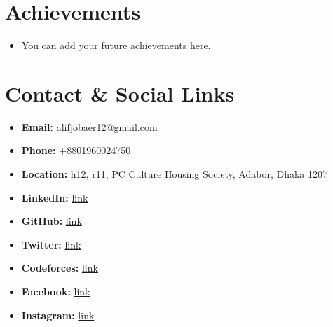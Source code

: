 \documentclass[letterpaper,11pt]{article}
\newcommand{\resumeItem}[1]{
  \item\small{
    {#1 \vspace{-2pt}}
  }
}
\newcommand{\resumeSubHeadingListStart}{\begin{itemize}[leftmargin=0.15in, label={}]}
\newcommand{\resumeSubHeadingListEnd}{\end{itemize}}
\begin{document}
\section{Achievements}
\resumeSubHeadingListStart
    \resumeItem{You can add your future achievements here.}
\resumeSubHeadingListEnd

\section{Contact \& Social Links}
\resumeSubHeadingListStart
    \resumeItem{\textbf{Email:} alifjobaer12@gmail.com}
    \resumeItem{\textbf{Phone:} +8801960024750}
    \resumeItem{\textbf{Location:} h12, r11, PC Culture Housing Society, Adabor, Dhaka 1207}
    \resumeItem{\textbf{LinkedIn:} \href{https://www.linkedin.com/in/alifjobaer12}{link}}
    \resumeItem{\textbf{GitHub:} \href{https://github.com/alifjobaer12}{link}}
    \resumeItem{\textbf{Twitter:} \href{https://x.com/allifjobaer12}{link}}
    \resumeItem{\textbf{Codeforces:} \href{https://codeforces.com/profile/alifjobaer12}{link}}
    \resumeItem{\textbf{Facebook:} \href{https://www.facebook.com/jobaer.alif.3}{link}}
    \resumeItem{\textbf{Instagram:} \href{https://www.instagram.com/j.i.alif_}{link}}
\resumeSubHeadingListEnd
\end{document}
